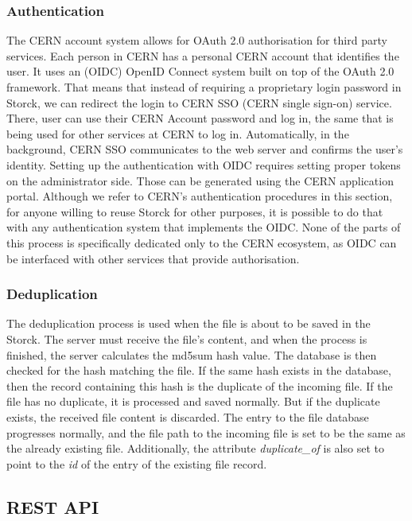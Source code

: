 \subsubsection{Authentication}
The CERN account system allows for OAuth 2.0 \cite{rfc6819} authorisation for third party services.
Each person in CERN has a personal CERN account that identifies the user.
It uses an (OIDC) OpenID Connect system built on top of the OAuth 2.0 framework.
That means that instead of requiring a proprietary login password in Storck, we can redirect the login to CERN SSO (CERN single sign-on) service.
There, user can use their CERN Account password and log in, the same that is being used for other services at CERN to log in.
Automatically, in the background, CERN SSO communicates to the web server and confirms the user's identity.
Setting up the authentication with OIDC requires setting proper tokens on the administrator side. Those can be generated using the CERN application portal.
Although we refer to CERN's authentication procedures in this section, for anyone willing to reuse Storck for other purposes, it is possible to do that with any authentication system that implements the OIDC.
None of the parts of this process is specifically dedicated only to the CERN ecosystem, as OIDC can be interfaced with other services that provide authorisation.


\subsubsection{Deduplication}
\label{sec:deduplication}

The deduplication process is used when the file is about to be saved in the Storck.
The server must receive the file's content, and when the process is finished, the server calculates the md5sum hash value.
The database is then checked for the hash matching the file.
If the same hash exists in the database, then the record containing this hash is the duplicate of the incoming file.
If the file has no duplicate, it is processed and saved normally.
But if the duplicate exists, the received file content is discarded.
The entry to the file database progresses normally, and the file path to the incoming file is set to be the same as the already existing file.
Additionally, the attribute \textit{duplicate\_of} is also set to point to the \textit{id} of the entry of the existing file record.

\subsection{REST API}

